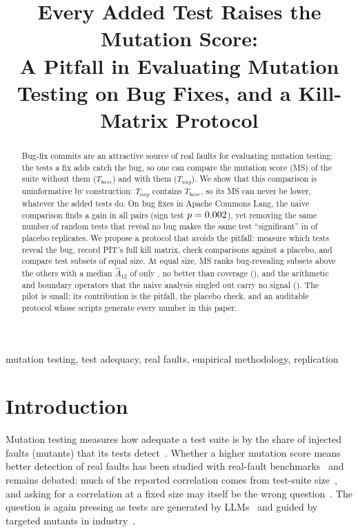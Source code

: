 \documentclass[conference]{IEEEtran}
\newif\ifanonymous
\newcommand{\Tbase}{T_{\mathit{base}}}
\newcommand{\Taug}{T_{\mathit{aug}}}
\begin{document}
\title{Every Added Test Raises the Mutation Score:\\
A Pitfall in Evaluating Mutation Testing on Bug Fixes, and a Kill-Matrix Protocol}

\ifanonymous
\author{\IEEEauthorblockN{Anonymous Author(s)}}
\else
\author{
}
\fi

\maketitle

\begin{abstract}
Bug-fix commits are an attractive source of real faults for evaluating mutation testing: the tests a fix
adds catch the bug, so one can compare the mutation score (MS) of the suite without them ($\Tbase$) and
with them ($\Taug$). We show that this comparison is uninformative by construction: $\Taug$ contains
$\Tbase$, so its MS can never be lower, whatever the added tests do. On \PitfallPairs{} bug fixes in
Apache Commons Lang, the naive comparison finds a gain in all \NaivePositivePairs{} pairs (sign test
$p=0.002$), yet removing the same number of random tests that reveal no bug makes the same test
``significant'' in \PlaceboSigShare{} of \PlaceboDraws{} placebo replicates. We propose a protocol that
avoids the pitfall: measure which tests reveal the bug, record PIT's full kill matrix, check comparisons
against a placebo, and compare test subsets of equal size. At equal size, MS ranks bug-revealing subsets
above the others with a median $\hat{A}_{12}$ of only \RqOneMedianMS{}, no better than coverage
(\RqOneMedianCov{}), and the arithmetic and boundary operators that the naive analysis singled out carry
no signal (\SelectionMedian{}). The pilot is small; its contribution is the pitfall, the placebo check, and
an auditable protocol whose scripts generate every number in this paper.
\end{abstract}

\begin{IEEEkeywords}
mutation testing, test adequacy, real faults, empirical methodology, replication
\end{IEEEkeywords}

\section{Introduction}
Mutation testing measures how adequate a test suite is by the share of injected faults (mutants) that its
tests detect~\cite{coles2016pit}. Whether a higher mutation score means better detection of real faults has
been studied with real-fault benchmarks~\cite{just2014mutants,just2014defects4j} and remains debated: much of
the reported correlation comes from test-suite size~\cite{papadakis2018mutation,inozemtseva2014coverage}, and
asking for a correlation at a fixed size may itself be the wrong question~\cite{chen2020revisiting}. The
question is again pressing as tests are generated by LLMs~\cite{zhao2026coverage} and guided by targeted
mutants in industry~\cite{foster2025mutation}.
\end{document}
